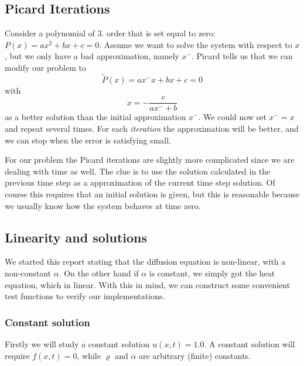 \documentclass[norsk,a4paper,12pt]{article}
\begin{document}
\subsection{Picard Iterations}
Consider a polynomial of 3. order that is set equal to zero: $P(x)=ax^2+bx+c=0$. Assume we want to solve the system with respect to $x$, but we only have a bad approximation, namely $x^-$. Picard tells us that we can modify our problem to 
\begin{equation}
\tilde{P}(x)=ax^-x+bx+c=0
\end{equation}
with 
\begin{equation}
x=-\frac{c}{ax^-+b}
\end{equation}
as a better solution than the initial approximation $x^-$. We could now set $x^-=x$ and repeat several times. For each \textit{iteration} the approximation will be better, and we can stop when the error is satisfying small.

For our problem the Picard iterations are slightly more complicated since we are dealing with time as well. The clue is to use the solution calculated in the previous time step as a approximation of the current time step solution. Of course this requires that an initial solution is given, but this is reasonable because we usually know how the system behaves at time zero.

\subsection{Linearity and solutions \label{sec:functions}}
We started this report stating that the diffusion equation is non-linear, with a non-constant $\alpha$. On the other hand if $\alpha$ is constant, we simply got the heat equation, which in linear. With this in mind, we can construct some convenient test functions to verify our implementations. 

\subsubsection{Constant solution}
Firstly we will study a constant solution $u(x,t) = 1.0$. A constant solution will require $f(x,t)=0$, while $\varrho$ and $\alpha$ are arbitrary (finite) constants. 
\end{document}
